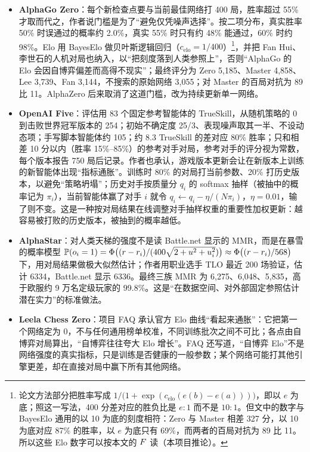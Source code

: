 \begin{itemize}
\item \textbf{AlphaGo Zero}：每个新检查点要与当前最佳网络打 400 局，胜率超过 55\% 才取而代之，作者说门槛是为了“避免仅凭噪声选择”\cite{silver2017mastering}\tagLit。按二项分布，真实胜率 50\% 时误通过的概率约 2.0\%，真实 55\% 时只有约 48\% 能通过，60\% 时约 98\%\tagOwn。Elo 用 BayesElo 做贝叶斯逻辑回归（$c_{\mathrm{elo}}=1/400$）\footnote{论文方法部分把胜率写成 $1/\bigl(1+\exp(c_{\mathrm{elo}}(e(b)-e(a)))\bigr)$，即以 $e$ 为底；照这一写法，400 分差对应的胜负比是 $e:1$ 而不是 $10:1$。但文中的数字与 BayesElo 通用的以 10 为底的刻度相符：Zero 与 Master 相差 327 分，以 10 为底对应 87\% 的胜率，以 $e$ 为底只有 69\%，而两者的百局对抗为 89 比 11。所以这些 Elo 数字可以按本文的 $F$ 读（本项目推论）。}，并把 Fan Hui、李世石的人机对局也纳入，以“把刻度落到人类参照上”，否则“AlphaGo 的 Elo 会因自博弈偏差而高得不现实”；最终评分为 Zero 5,185、Master 4,858、Lee 3,739、Fan 3,144，不搜索的原始网络 3,055；对 Master 的百局对抗为 89 比 11\cite{silver2017mastering}\tagLit。AlphaZero 后来取消了这道门槛，改为持续更新单一网络\cite{silver2017masteringchess}\tagLit。
\item \textbf{OpenAI Five}：评估用 83 个固定参考智能体的 TrueSkill，从随机策略的 0 到击败世界冠军版本的 254；初始不确定度 25/3、表现噪声取其一半、不设动态项；手写脚本智能体约 105；约 8.3 TrueSkill 的差对应 80\% 胜率；只和相差 10 分以内（胜率 15\%–85\%）的参考对手对局，参考对手的评分视为常数，每个版本报告 750 局后记录\cite{berner2019dota}\tagLit。作者也承认，游戏版本更新会让在新版本上训练的新智能体出现“指标通胀”。训练时 80\% 的对局打当前参数、20\% 打历史版本，以避免“策略坍塌”；历史对手按质量分 $q_i$ 的 softmax 抽样（被抽中的概率记为 $\pi_i$），当前智能体赢了对手 $i$ 就令 $q_i\leftarrow q_i-\eta/(N\pi_i)$，$\eta=0.01$，输了则不变\cite{berner2019dota}\tagLit。这是一种按对局结果在线调整对手抽样权重的重要性加权更新：越容易被打败的历史版本，被抽到的概率越低。
\item \textbf{AlphaStar}：对人类天梯的强度不是读 Battle.net 显示的 MMR，而是在暴雪的概率模型 $\mathbb{P}(o_i=1)=\Phi\bigl((r-r_i)/(400\sqrt{2+u^2+u_i^2})\bigr)\approx\Phi\bigl((r-r_i)/568\bigr)$ 下，用对局结果做极大似然估计；作者用职业选手 TLO 最近 200 场验证，估计 6334，Battle.net 显示 6336。最终三族 MMR 为 6,275、6,048、5,835，高于欧服约 9 万名定级玩家的 99.8\%\cite{vinyals2019grandmaster}\tagLit。这是“在数据空间、对外部固定参照估计潜在实力”的标准做法。
\item \textbf{Leela Chess Zero}：项目 FAQ 承认官方 Elo 曲线“看起来通胀”：它把第一个网络定为 0，不与任何通用榜单校准，不同训练批次之间不可比；各点由自博弈对局算出，“自博弈往往夸大 Elo 增长”。FAQ 还写道，“自博弈 Elo”不是网络强度的真实指标，只是训练是否健康的一般参数；某个网络可能打其他引擎更差，却在直接对局中赢下所有其他网络\cite{lczero2019faq}\tagOff。
\end{itemize}

